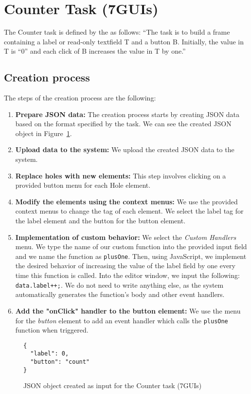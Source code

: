 \section{Counter Task (7GUIs)}
The Counter task is defined by the \citet{7GUIs-web} as follows: ``The task is to build a frame containing a label or read-only textfield T and a button B. Initially, the value in T is “0” and each click of B increases the value in T by one.''

\subsection {Creation process}

The steps of the creation process are the following:
\begin{enumerate}
	\item \textbf{Prepare JSON data:} The creation process starts by creating JSON data based on the format specified by the task.
	      We can see the created JSON object in Figure~\ref{fig:counter-json}.
	\item \textbf{Upload data to the system:} We upload the created JSON data to the system.
	\item \textbf{Replace holes with new elements:} This step involves clicking on a provided button menu for each Hole element.
	\item \textbf{Modify the elements using the context menus:} We use the provided context menus to change the tag of each element.
	      We select the label tag for the label element and the button for the button element.
	\item \textbf{Implementation of custom behavior:} We select the \emph{Custom Handlers} menu.
	      We type the name of our custom function into the provided input field and
	      we name the function as \texttt{plusOne}.
	      Then, using JavaScript, we implement the desired behavior of increasing the value of the label field by one
	      every time this function is called.
	      Into the editor window, we input the following: \texttt{data.label++;}.
	      We do not need to write anything else, as the system automatically generates the function's body and other event handlers.
	\item \textbf{Add the "onClick" handler to the button element:} We use the menu for the \emph{button} element to add an event handler
	      which calls the \texttt{plusOne} function when triggered.
\end{enumerate}


\begin{figure}[htbp]
	\caption{JSON object created as input for the Counter task (7GUIs)}
	\label{fig:counter-json}
	\begin{lstlisting}
{
  "label": 0,
  "button": "count"
}
    \end{lstlisting}
\end{figure}

